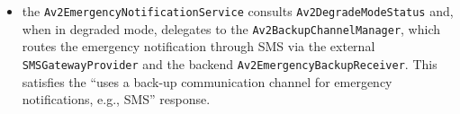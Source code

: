 \begin{itemize}
        \texttt{Av2NetworkConnectivityMonitor} drive the
        \texttt{Av2PatientAlertService}, which warns the patient when the
        battery drops to $\leq 15\,\%$ or connectivity is poor / absent --
        satisfying Av2 \emph{prevention} response measures verbatim;
  \item the \texttt{Av2EmergencyNotificationService} consults
        \texttt{Av2DegradeModeStatus} and, when in degraded mode, delegates
        to the \texttt{Av2BackupChannelManager}, which routes the emergency
        notification through SMS via the external
        \texttt{SMSGatewayProvider} and the backend
        \texttt{Av2EmergencyBackupReceiver}. This satisfies the ``uses a
        back-up communication channel for emergency notifications, e.g.,
        SMS'' response.
\end{itemize}

